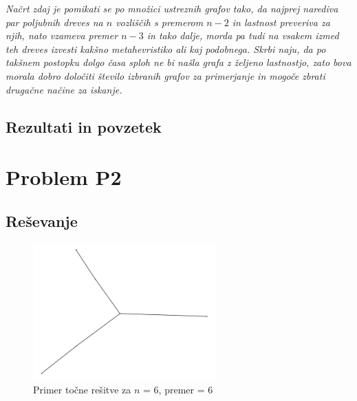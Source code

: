 \documentclass[a4paper, 12 pt]{article}
\begin{document}
\vspace{1cm}



\itshape{ Načrt zdaj je pomikati se po množici ustreznih grafov tako, da najprej narediva par poljubnih dreves na $n$ vozliščih s premerom $n - 2$ in lastnost preveriva za njih, nato vzameva premer $n - 3$ in tako dalje, morda pa tudi na vsakem izmed teh dreves izvesti kakšno metahevristiko ali kaj podobnega. Skrbi naju, da po takšnem postopku dolgo časa sploh ne bi našla grafa z željeno lastnostjo, zato bova morala dobro določiti število izbranih grafov za primerjanje in mogoče zbrati drugačne načine za iskanje.
}

\subsection{Rezultati in povzetek}


\pagebreak

\section{Problem P2}

\subsection{Reševanje}


\begin{figure}[H]
\centering
  \includegraphics[width=7cm]{drevo6diam4.png}
  \caption{Primer točne rešitve za $n$ = 6, premer = 6}
  \label{fig:graf1} 
\end{figure}
\end{document}
